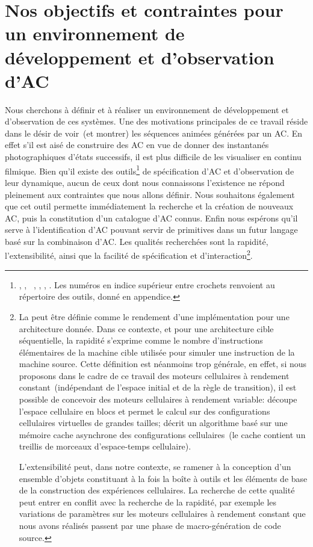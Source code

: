 \section[Objectifs et contraintes]{Nos objectifs et contraintes pour un
  environnement de dé\-ve\-lop\-pe\-ment et d'observation d'AC}

Nous cherchons à définir et à réaliser un environnement de
développement et d'observation de ces systèmes. %
Une des motivations principales de ce travail réside dans le désir de
voir~(et montrer) les séquences animées générées par un AC\@. %
En effet s'il est aisé de construire des AC en vue de donner des
instantanés photographiques d'états successifs, il est plus difficile de
les visualiser en continu filmique. %
Bien qu'il existe des outils\footnote{%
  , %
  , %
  ~\cite[]{Rucker89}, %
  , %
  , %
  . %
  Les numéros en indice supérieur entre crochets renvoient au répertoire des
  outils, donné en appendice.} %
de spécification d'AC et d'observation de leur dynamique, aucun de
ceux dont nous connaissons l'existence ne répond
pleinement aux contraintes que nous allons définir. %
Nous souhaitons également que cet outil permette immédiatement la
recherche et la création de nouveaux AC, puis la constitution d'un
catalogue d'AC connus. %
Enfin nous espérons qu'il serve à l'identification d'AC pouvant servir
de primitives dans un futur langage basé sur la combinaison d'AC. %
Les qualités recherchées sont la rapidité, l'extensibilité, ainsi que la
facilité de spécification et d'interaction\footnote{%
  La  peut être définie comme le rendement d'une
  implémentation   pour une architecture donnée. %
  Dans ce contexte, et pour une architecture cible séquentielle, la
  rapidité s'exprime comme le nombre d'instructions
  élémentaires de la machine cible utilisée pour simuler une
  instruction de la machine source. %
  Cette définition est néanmoins trop générale, en effet, si nous
  proposons dans le cadre de ce travail des moteurs cellulaires à
  rendement constant~(\ie indépendant de l'espace initial et de la
  règle de transition), il est possible de concevoir des moteurs
  cellulaires à rendement variable:  découpe
  l'espace cellulaire en blocs et permet le calcul sur des
  configurations cellulaires virtuelles de grandes tailles;
  \cite{Gosper84} décrit un algorithme basé sur une mémoire cache
  asynchrone des configurations cellulaires~(le cache contient un
  treillis de morceaux d'espace-temps cellulaire). %

  L'extensibilité peut, dans notre contexte, se ramener à la
  conception d'un ensemble d'objets constituant à la fois la boîte à
  outils et les éléments de base de la construction des expériences
  cellulaires. %
  La recherche de cette qualité peut entrer en conflit avec la
  recherche de la rapidité, par exemple les variations de paramètres
  sur les moteurs cellulaires à rendement constant que nous avons
  réalisés passent par une phase de macro-génération de code source.}. %


